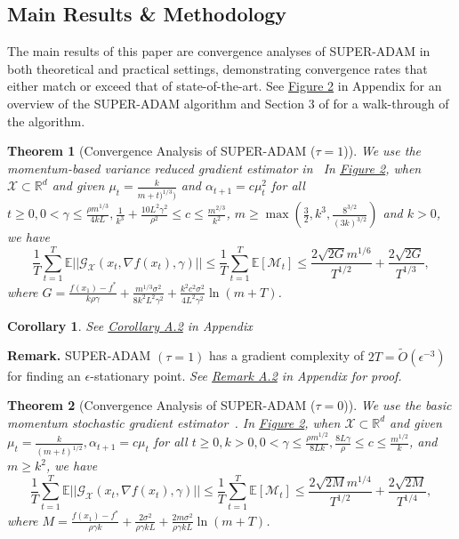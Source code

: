 \documentclass{article}
\newtheorem{theorem}{Theorem}[section]
\newtheorem{corollary}{Corollary}[section]
\begin{document}
\subsection{Main Results \& Methodology}
The main results of this paper are convergence analyses of SUPER-ADAM in both theoretical and practical settings, demonstrating convergence rates that either match or exceed that of state-of-the-art. See \hyperref[fig2]{Figure 2} in Appendix for an overview of the SUPER-ADAM algorithm and
Section 3 of \cite{https://doi.org/10.48550/arxiv.2106.08208} for a walk-through of the algorithm.
\begin{theorem}[Convergence Analysis of SUPER-ADAM ($\tau = 1$)]
	We use the momentum-based variance reduced gradient estimator in~\cite{https://doi.org/10.48550/arxiv.1905.10018, https://doi.org/10.48550/arxiv.1905.05920}
	In \hyperref[fig2]{Figure 2}, when $\mathcal{X}\subset\mathbb{R}^d$ and given $\mu_t = \frac{k}{m+t)^{1/3})}$ and $\alpha_{t+1}=c\mu^2_t$ for all $t\geq 0, 0 < \gamma \leq \frac{\rho m^{1/3}}{4kL}, \frac{1}{k^3} + \frac{10L^2 \gamma^2}{\rho^2}\leq c\leq \frac{m^{2/3}}{k^2}$,
	$m\geq\max\left(\frac{3}{2}, k^3, \frac{8^{3/2}}{(3k)^{3/2}}\right)$ and $k > 0$, we have
	\begin{equation}
		\label{eq61}
		\frac{1}{T}\sum^T_{t=1}\mathbb{E}||\mathcal{G}_{\mathcal{X}}(x_t, \nabla f(x_t), \gamma)||\leq
		\frac{1}{T}\sum^T_{t=1}\mathbb{E}[\mathcal{M}_t]\leq
		\frac{2\sqrt{2G}m^{1/6}}{T^{1/2}} + \frac{2\sqrt{2G}}{T^{1/3}},
	\end{equation}
	where $G = \frac{f(x_1) - f^*}{k\rho\gamma} + \frac{m^{1/3}\sigma^2}{8k^2 L^2 \gamma^2} + \frac{k^2 c^2 \sigma^2}{4L^2 \gamma^2}\ln(m+T)$.
\end{theorem}
\begin{corollary}
		See \hyperref[coro51appendix]{Corollary A.2} in Appendix
\end{corollary}
\textbf{Remark.} SUPER-ADAM $(\tau = 1)$ has a gradient complexity of $2T = \tilde{O}(\epsilon^{-3})$ for finding an $\epsilon$-stationary point. \textit{See \hyperref[rmka2]{Remark A.2} in Appendix for proof.}
\begin{theorem}[Convergence Analysis of SUPER-ADAM ($\tau = 0$)]
	We use the basic momentum stochastic gradient estimator~\cite{https://doi.org/10.48550/arxiv.1412.6980}.
	In \hyperref[fig2]{Figure 2}, when $\mathcal{X}\subset \mathbb{R}^d$ and given $\mu_t = \frac{k}{(m+t)^{1/2}}, \alpha_{t+1} = c\mu_t$ for all $t\geq 0, k > 0, 0 < \gamma \leq \frac{\rho m^{1/2}}{8Lk}, \frac{8L\gamma}{\rho}\leq c\leq \frac{m^{1/2}}{k}$,
	and $m\geq k^2$, we have
	\begin{equation}
		\frac{1}{T}\sum^T_{t=1}\mathbb{E}||\mathcal{G}_{\mathcal{X}}(x_t, \nabla f(x_t), \gamma)||\leq
		\frac{1}{T}\sum^T_{t=1}\mathbb{E}[\mathcal{M}_t]\leq
		\frac{2\sqrt{2M}m^{1/4}}{T^{1/2}} + \frac{2\sqrt{2M}}{T^{1/4}},
	\end{equation}
	where $M = \frac{f(x_1) - f^*}{\rho\gamma k} + \frac{2\sigma^2}{\rho\gamma kL} + \frac{2m\sigma^2}{\rho\gamma kL}\ln(m+T)$.
\end{theorem}
\end{document}
